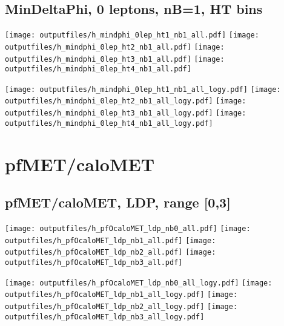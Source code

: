 \documentclass[11pt]{article}
\begin{document}
    \subsection{ MinDeltaPhi, 0 leptons, nB=1, HT bins }

    \noindent
     \texttt{[image: outputfiles/h\_mindphi\_0lep\_ht1\_nb1\_all.pdf]}
     \texttt{[image: outputfiles/h\_mindphi\_0lep\_ht2\_nb1\_all.pdf]}
     \texttt{[image: outputfiles/h\_mindphi\_0lep\_ht3\_nb1\_all.pdf]}
     \texttt{[image: outputfiles/h\_mindphi\_0lep\_ht4\_nb1\_all.pdf]}

    \noindent
     \texttt{[image: outputfiles/h\_mindphi\_0lep\_ht1\_nb1\_all\_logy.pdf]}
     \texttt{[image: outputfiles/h\_mindphi\_0lep\_ht2\_nb1\_all\_logy.pdf]}
     \texttt{[image: outputfiles/h\_mindphi\_0lep\_ht3\_nb1\_all\_logy.pdf]}
     \texttt{[image: outputfiles/h\_mindphi\_0lep\_ht4\_nb1\_all\_logy.pdf]}

    \clearpage





   \section{ pfMET/caloMET}

    \subsection{ pfMET/caloMET, LDP, range [0,3]}

    \noindent
     \texttt{[image: outputfiles/h\_pfOcaloMET\_ldp\_nb0\_all.pdf]}
     \texttt{[image: outputfiles/h\_pfOcaloMET\_ldp\_nb1\_all.pdf]}
     \texttt{[image: outputfiles/h\_pfOcaloMET\_ldp\_nb2\_all.pdf]}
     \texttt{[image: outputfiles/h\_pfOcaloMET\_ldp\_nb3\_all.pdf]}

    \noindent
     \texttt{[image: outputfiles/h\_pfOcaloMET\_ldp\_nb0\_all\_logy.pdf]}
     \texttt{[image: outputfiles/h\_pfOcaloMET\_ldp\_nb1\_all\_logy.pdf]}
     \texttt{[image: outputfiles/h\_pfOcaloMET\_ldp\_nb2\_all\_logy.pdf]}
     \texttt{[image: outputfiles/h\_pfOcaloMET\_ldp\_nb3\_all\_logy.pdf]}

    \clearpage
\end{document}

